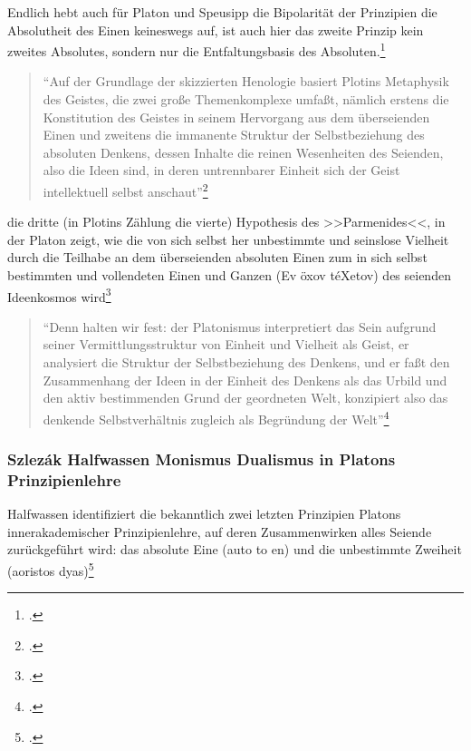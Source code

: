 \documentclass[12pt]{article}
\newcommand*{\zitatblock}[1]{%
    \begin{quote}
    \fontsize{10}{12}\selectfont
    \setlength{\parskip}{1.0em}
    #1
    \end{quote}
}
\begin{document}
Endlich hebt auch für Platon und Speusipp die Bipolarität der Prinzipien die Absolutheit des Einen keineswegs auf, ist auch hier das zweite Prinzip kein zweites Absolutes, sondern nur die Entfaltungsbasis des Absoluten.\footcite[][S. 53]{HalfwassenGeistmetaphysik}

\zitatblock{\enquote{Auf der Grundlage der skizzierten Henologie basiert Plotins Metaphysik des Geistes, die zwei große Themenkomplexe umfaßt, nämlich erstens die Konstitution des Geistes in seinem Hervorgang aus dem überseienden Einen und zweitens die immanente Struktur der Selbstbeziehung des absoluten Denkens, dessen Inhalte die reinen Wesenheiten des Seienden, also die Ideen sind, in deren untrennbarer Einheit sich der Geist intellektuell selbst anschaut}\footcite[][S. 54]{HalfwassenGeistmetaphysik}}

die dritte (in Plotins Zählung die vierte) Hypothesis des >>Parmenides<<, in der Platon zeigt, wie die von sich selbst her unbestimmte und seinslose Vielheit durch die Teilhabe an dem überseienden absoluten Einen zum in sich selbst bestimmten und vollendeten Einen und Ganzen (Ev öxov téXetov) des seienden Ideenkosmos wird\footcite[vgl.][S. 54f.]{HalfwassenGeistmetaphysik}

\zitatblock{\enquote{Denn halten wir fest: der Platonismus interpretiert das Sein aufgrund seiner Vermittlungsstruktur von Einheit und Vielheit als Geist, er analysiert die Struktur der Selbstbeziehung des Denkens, und er faßt den Zusammenhang der Ideen in der Einheit des Denkens als das Urbild und den aktiv bestimmenden Grund der geordneten Welt, konzipiert also das denkende Selbstverhältnis zugleich als Begründung der Welt}\footcite[][S. 60]{HalfwassenGeistmetaphysik}}

\subsubsection*{Szlezák Halfwassen Monismus Dualismus in Platons Prinzipienlehre}

Halfwassen identifiziert die bekanntlich zwei letzten Prinzipien Platons innerakademischer Prinzipienlehre, auf deren Zusammenwirken alles Seiende zurückgeführt wird: das absolute Eine (auto to en) und die unbestimmte Zweiheit (aoristos dyas)\footcite[vgl.][S. 67]{HalfwassenMonismusDualismus}
\end{document}
